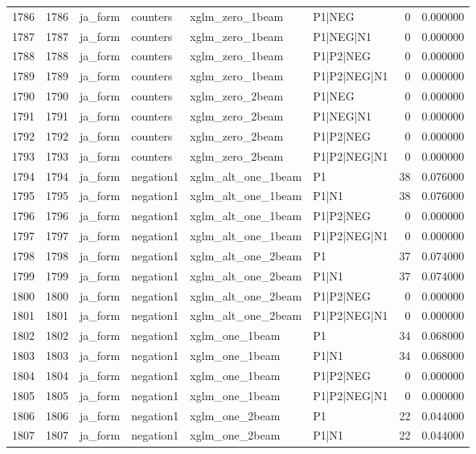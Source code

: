 \begin{tabular}{lrllllrr}
1786 & 1786 & ja_form & counters & xglm_zero_1beam & P1|NEG & 0 & 0.000000 \\
1787 & 1787 & ja_form & counters & xglm_zero_1beam & P1|NEG|N1 & 0 & 0.000000 \\
1788 & 1788 & ja_form & counters & xglm_zero_1beam & P1|P2|NEG & 0 & 0.000000 \\
1789 & 1789 & ja_form & counters & xglm_zero_1beam & P1|P2|NEG|N1 & 0 & 0.000000 \\
1790 & 1790 & ja_form & counters & xglm_zero_2beam & P1|NEG & 0 & 0.000000 \\
1791 & 1791 & ja_form & counters & xglm_zero_2beam & P1|NEG|N1 & 0 & 0.000000 \\
1792 & 1792 & ja_form & counters & xglm_zero_2beam & P1|P2|NEG & 0 & 0.000000 \\
1793 & 1793 & ja_form & counters & xglm_zero_2beam & P1|P2|NEG|N1 & 0 & 0.000000 \\
1794 & 1794 & ja_form & negation1 & xglm_alt_one_1beam & P1 & 38 & 0.076000 \\
1795 & 1795 & ja_form & negation1 & xglm_alt_one_1beam & P1|N1 & 38 & 0.076000 \\
1796 & 1796 & ja_form & negation1 & xglm_alt_one_1beam & P1|P2|NEG & 0 & 0.000000 \\
1797 & 1797 & ja_form & negation1 & xglm_alt_one_1beam & P1|P2|NEG|N1 & 0 & 0.000000 \\
1798 & 1798 & ja_form & negation1 & xglm_alt_one_2beam & P1 & 37 & 0.074000 \\
1799 & 1799 & ja_form & negation1 & xglm_alt_one_2beam & P1|N1 & 37 & 0.074000 \\
1800 & 1800 & ja_form & negation1 & xglm_alt_one_2beam & P1|P2|NEG & 0 & 0.000000 \\
1801 & 1801 & ja_form & negation1 & xglm_alt_one_2beam & P1|P2|NEG|N1 & 0 & 0.000000 \\
1802 & 1802 & ja_form & negation1 & xglm_one_1beam & P1 & 34 & 0.068000 \\
1803 & 1803 & ja_form & negation1 & xglm_one_1beam & P1|N1 & 34 & 0.068000 \\
1804 & 1804 & ja_form & negation1 & xglm_one_1beam & P1|P2|NEG & 0 & 0.000000 \\
1805 & 1805 & ja_form & negation1 & xglm_one_1beam & P1|P2|NEG|N1 & 0 & 0.000000 \\
1806 & 1806 & ja_form & negation1 & xglm_one_2beam & P1 & 22 & 0.044000 \\
1807 & 1807 & ja_form & negation1 & xglm_one_2beam & P1|N1 & 22 & 0.044000 \\

\end{tabular}
